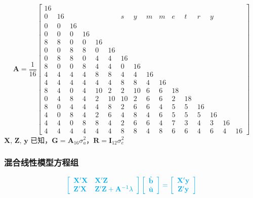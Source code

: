 \documentclass[serif,aspectratio=169]{beamer}
\begin{document}
\begin{frame}
  \begingroup
  \fontsize{8pt}{8pt}\selectfont
  $$
  \mathbf{A}=\frac{1}{16}\left[\begin{array}{rrrrrrrrrrrrrrrr}
      16\\
      0 & 16 &  &  &  & & s & y & m & m & e & t & r & y\\
      0 & 0 & 16\\
      0 & 0 & 0 & 16\\
      8 & 8 & 0 & 0 & 16\\
      0 & 0 & 8 & 8 & 0 & 16\\
      0 & 8 & 8 & 0 & 4 & 4 & 16\\
      8 & 0 & 0 & 8 & 4 & 4 & 0 & 16\\
      4 & 4 & 4 & 4 & 8 & 8 & 4 & 4 & 16\\
      4 & 4 & 4 & 4 & 4 & 4 & 8 & 8 & 4 & 16\\
      8 & 4 & 0 & 4 & 10 & 2 & 2 & 10 & 6 & 6 & 18\\
      0 & 4 & 8 & 4 & 2 & 10 & 10 & 2 & 6 & 6 & 2 & 18\\
      8 & 0 & 4 & 4 & 4 & 8 & 2 & 6 & 6 & 4 & 5 & 5 & 16\\
      4 & 0 & 8 & 4 & 2 & 6 & 4 & 8 & 4 & 6 & 5 & 5 & 5 & 16\\
      4 & 4 & 0 & 8 & 8 & 4 & 2 & 6 & 6 & 4 & 7 & 3 & 4 & 3 & 16\\
      4 & 4 & 4 & 4 & 4 & 4 & 8 & 8 & 4 & 8 & 6 & 6 & 4 & 6 & 4 & 16
    \end{array}\right]
  $$
  $\mathbf{X,\,Z,\,y}$ 已知，$\mathbf{G=A}_{16}\sigma_a^2$，$\mathbf{R=I}_{12}\sigma_e^2$
  \endgroup
\end{frame}


\begin{frame}
  \frametitle{混合线性模型方程组}
  $$
  \color{cyan}\left[\begin{array}{ll}
      \mathbf{X}'\mathbf{X} & \mathbf{X}'\mathbf{Z}\\
      \mathbf{Z}'\mathbf{X} & \mathbf{Z}'\mathbf{Z}+\mathbf{A}^{-1}\lambda
    \end{array}\right]
  \left[\begin{array}{cc}
      \hat{\mathbf{b}}\\
      \hat{\mathbf{u}}
    \end{array}\right] = 
  \left[\begin{array}{c}
      \mathbf{X}'\mathbf{y}\\
      \mathbf{Z}'\mathbf{y}
    \end{array}\right]
  $$
\end{frame}
\end{document}
